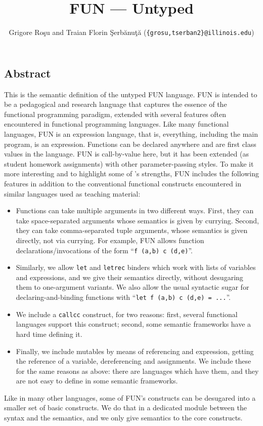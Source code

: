 \setlength{\parindent}{1em}
\title{FUN --- Untyped}
\author{Grigore Ro\c{s}u and 
        Traian Florin \c{S}erb\u{a}nu\c{t}\u{a} (\texttt{\{grosu,tserban2\}@illinois.edu})}

\maketitle

\begin{kblock}[text]
\section{Abstract}
This is the \K semantic definition of the untyped FUN language.
FUN is intended to be a pedagogical and research language that captures
the essence of the functional programming paradigm, extended with several
features often encountered in functional programming languages.
Like many functional languages, FUN is an expression language,
that is, everything, including the main program, is an expression.
Functions can be declared anywhere and are first class values in the
language.  FUN is call-by-value here, but it has been extended (as
student homework assignments) with other parameter-passing styles.
To make it more interesting and to highlight some of \K's strengths,
FUN includes the following features in addition to the conventional
functional constructs encountered in similar languages used as
teaching material:
\begin{itemize}
\item Functions can take multiple arguments in two different ways.
First, they can take space-separated arguments whose semantics is given by
currying.  Second, they can take comma-separated tuple arguments, whose
semantics is given directly, not via currying.  For example, FUN allows
function declarations/invocations of the form
``\texttt{f (a,b) c  (d,e)}''.
\item Similarly, we allow \texttt{let} and \texttt{letrec} binders
which work with lists of variables and expressions, and we give
their semantics directly, without desugaring them to one-argument variants.
We also allow the usual syntactic sugar for declaring-and-binding functions
with ``\texttt{let f (a,b) c (d,e) = ...}''.
\item We include a \texttt{callcc} construct, for two reasons: first,
several functional languages support this construct; second, some
semantic frameworks have a hard time defining it.
\item Finally, we include mutables by means of referencing and
expression, getting the reference of a variable, dereferencing and
assignments.  We include these for the same reasons as above: there
are languages which have them, and they are not easy to define in some
semantic frameworks.
\end{itemize}
Like in many other languages, some of FUN's constructs can be
desugared into a smaller set of basic constructs.  We do that in a 
dedicated module between the syntax and the semantics, and we only
give semantics to the core constructs.


\end{kblock}

